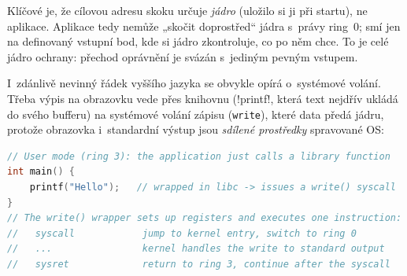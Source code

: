 \begin{intuice}
Klíčové je, že cílovou adresu skoku určuje \emph{jádro} (uložilo si ji při startu), ne aplikace. Aplikace tedy nemůže „skočit doprostřed`` jádra s~právy ring~0; smí jen na definovaný vstupní bod, kde si jádro zkontroluje, co po něm chce. To je celé jádro ochrany: přechod oprávnění je svázán s~jediným pevným vstupem.
\end{intuice}

I~zdánlivě nevinný řádek vyššího jazyka se obvykle opírá o~systémové volání. Třeba výpis na obrazovku vede přes knihovnu (\cd!printf!, která text nejdřív ukládá do svého bufferu) na systémové volání zápisu (\texttt{write}), které data předá jádru, protože obrazovka i~standardní výstup jsou \emph{sdílené prostředky} spravované OS:

\begin{lstlisting}[language=C]
// User mode (ring 3): the application just calls a library function
int main() {
    printf("Hello");   // wrapped in libc -> issues a write() syscall
}
// The write() wrapper sets up registers and executes one instruction:
//   syscall            jump to kernel entry, switch to ring 0
//   ...                kernel handles the write to standard output
//   sysret             return to ring 3, continue after the syscall
\end{lstlisting}

